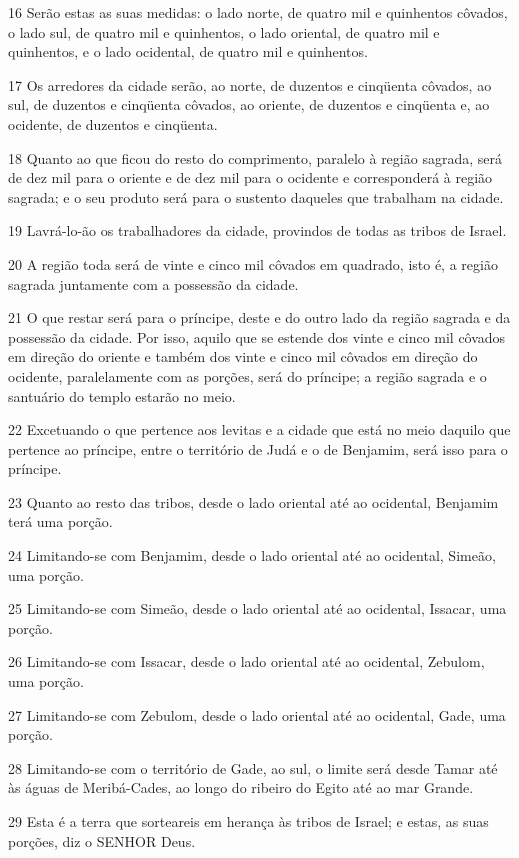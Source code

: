 \par 16 Serão estas as suas medidas: o lado norte, de quatro mil e quinhentos côvados, o lado sul, de quatro mil e quinhentos, o lado oriental, de quatro mil e quinhentos, e o lado ocidental, de quatro mil e quinhentos.
\par 17 Os arredores da cidade serão, ao norte, de duzentos e cinqüenta côvados, ao sul, de duzentos e cinqüenta côvados, ao oriente, de duzentos e cinqüenta e, ao ocidente, de duzentos e cinqüenta.
\par 18 Quanto ao que ficou do resto do comprimento, paralelo à região sagrada, será de dez mil para o oriente e de dez mil para o ocidente e corresponderá à região sagrada; e o seu produto será para o sustento daqueles que trabalham na cidade.
\par 19 Lavrá-lo-ão os trabalhadores da cidade, provindos de todas as tribos de Israel.
\par 20 A região toda será de vinte e cinco mil côvados em quadrado, isto é, a região sagrada juntamente com a possessão da cidade.
\par 21 O que restar será para o príncipe, deste e do outro lado da região sagrada e da possessão da cidade. Por isso, aquilo que se estende dos vinte e cinco mil côvados em direção do oriente e também dos vinte e cinco mil côvados em direção do ocidente, paralelamente com as porções, será do príncipe; a região sagrada e o santuário do templo estarão no meio.
\par 22 Excetuando o que pertence aos levitas e a cidade que está no meio daquilo que pertence ao príncipe, entre o território de Judá e o de Benjamim, será isso para o príncipe.
\par 23 Quanto ao resto das tribos, desde o lado oriental até ao ocidental, Benjamim terá uma porção.
\par 24 Limitando-se com Benjamim, desde o lado oriental até ao ocidental, Simeão, uma porção.
\par 25 Limitando-se com Simeão, desde o lado oriental até ao ocidental, Issacar, uma porção.
\par 26 Limitando-se com Issacar, desde o lado oriental até ao ocidental, Zebulom, uma porção.
\par 27 Limitando-se com Zebulom, desde o lado oriental até ao ocidental, Gade, uma porção.
\par 28 Limitando-se com o território de Gade, ao sul, o limite será desde Tamar até às águas de Meribá-Cades, ao longo do ribeiro do Egito até ao mar Grande.
\par 29 Esta é a terra que sorteareis em herança às tribos de Israel; e estas, as suas porções, diz o SENHOR Deus.
